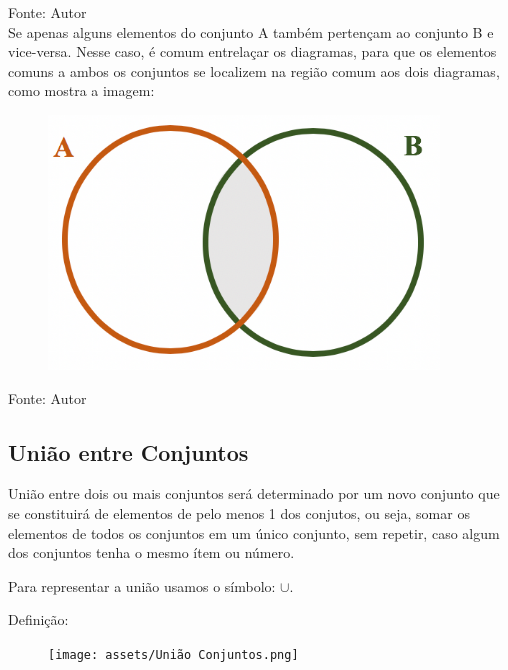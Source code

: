 \begin{multicols*}{2}
	Fonte: Autor\\

	Se apenas alguns elementos do conjunto A também pertençam ao conjunto B e vice-versa. Nesse caso, é comum entrelaçar os diagramas, para que os elementos comuns a ambos os conjuntos se localizem na região comum aos dois diagramas, como mostra a imagem:\\

	\begin{figure}[H]
		\centering
		\includegraphics[width=\columnwidth]{assets/Conjunto Intersecção.png}
	\end{figure}

	Fonte: Autor\\

	\subsection{União entre Conjuntos}

	União entre dois ou mais conjuntos será determinado por um novo conjunto que se constituirá de elementos de pelo menos 1 dos conjutos, ou seja, somar os elementos de todos os conjuntos em um único conjunto, sem repetir, caso algum dos conjuntos tenha o mesmo ítem ou número.

	Para representar a união usamos o símbolo: $ \mathbf{ \cup } $.

	Definição:


	\begin{figure}[H]
		\centering
		\texttt{[image: assets/União Conjuntos.png]}
	\end{figure}


\end{multicols*}
